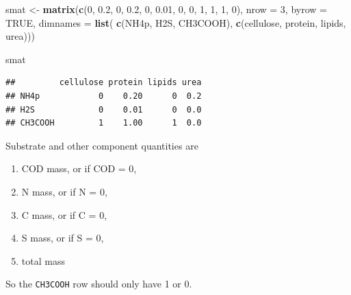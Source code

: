 \documentclass[
]{article}
\newenvironment{Shaded}{\begin{snugshade}}{\end{snugshade}}
\newcommand{\AttributeTok}[1]{\textcolor[rgb]{0.13,0.29,0.53}{#1}}
\newcommand{\ConstantTok}[1]{\textcolor[rgb]{0.56,0.35,0.01}{#1}}
\newcommand{\DecValTok}[1]{\textcolor[rgb]{0.00,0.00,0.81}{#1}}
\newcommand{\FloatTok}[1]{\textcolor[rgb]{0.00,0.00,0.81}{#1}}
\newcommand{\FunctionTok}[1]{\textcolor[rgb]{0.13,0.29,0.53}{\textbf{#1}}}
\newcommand{\NormalTok}[1]{#1}
\newcommand{\OtherTok}[1]{\textcolor[rgb]{0.56,0.35,0.01}{#1}}
\newcommand{\StringTok}[1]{\textcolor[rgb]{0.31,0.60,0.02}{#1}}
\providecommand{\tightlist}{%
  \setlength{\itemsep}{0pt}\setlength{\parskip}{0pt}}
\begin{document}
\begin{Shaded}
\begin{Highlighting}[]
\NormalTok{smat }\OtherTok{\textless{}{-}} \FunctionTok{matrix}\NormalTok{(}\FunctionTok{c}\NormalTok{(}\DecValTok{0}\NormalTok{, }\FloatTok{0.2}\NormalTok{,  }\DecValTok{0}\NormalTok{, }\FloatTok{0.2}\NormalTok{,}
                 \DecValTok{0}\NormalTok{, }\FloatTok{0.01}\NormalTok{, }\DecValTok{0}\NormalTok{, }\DecValTok{0}\NormalTok{,}
                 \DecValTok{1}\NormalTok{, }\DecValTok{1}\NormalTok{,    }\DecValTok{1}\NormalTok{, }\DecValTok{0}\NormalTok{),}
               \AttributeTok{nrow =} \DecValTok{3}\NormalTok{,}
               \AttributeTok{byrow =} \ConstantTok{TRUE}\NormalTok{,}
               \AttributeTok{dimnames =} \FunctionTok{list}\NormalTok{(}
                 \FunctionTok{c}\NormalTok{(}\StringTok{\textquotesingle{}NH4p\textquotesingle{}}\NormalTok{, }\StringTok{\textquotesingle{}H2S\textquotesingle{}}\NormalTok{, }\StringTok{\textquotesingle{}CH3COOH\textquotesingle{}}\NormalTok{),}
                 \FunctionTok{c}\NormalTok{(}\StringTok{\textquotesingle{}cellulose\textquotesingle{}}\NormalTok{, }\StringTok{\textquotesingle{}protein\textquotesingle{}}\NormalTok{, }\StringTok{\textquotesingle{}lipids\textquotesingle{}}\NormalTok{, }\StringTok{\textquotesingle{}urea\textquotesingle{}}\NormalTok{)))}

\NormalTok{smat}
\end{Highlighting}
\end{Shaded}

\begin{verbatim}
##         cellulose protein lipids urea
## NH4p            0    0.20      0  0.2
## H2S             0    0.01      0  0.0
## CH3COOH         1    1.00      1  0.0
\end{verbatim}

Substrate and other component quantities are

\begin{enumerate}
\def\labelenumi{\arabic{enumi}.}
\tightlist
\item
  COD mass, or if COD = 0,
\item
  N mass, or if N = 0,
\item
  C mass, or if C = 0,
\item
  S mass, or if S = 0,
\item
  total mass
\end{enumerate}

So the \texttt{CH3COOH} row should only have 1 or 0.
\end{document}
